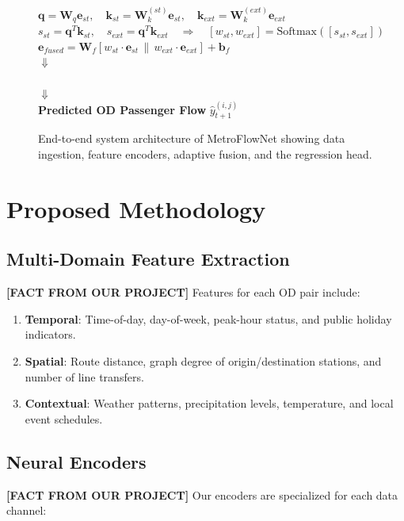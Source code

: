 \documentclass[conference]{IEEEtran}
\begin{document}
\begin{figure}[htbp]
{{{{$\mathbf{q} = \mathbf{W}_q \mathbf{e}_{st}, \quad \mathbf{k}_{st} = \mathbf{W}_k^{(st)} \mathbf{e}_{st}, \quad \mathbf{k}_{ext} = \mathbf{W}_k^{(ext)} \mathbf{e}_{ext}$ \\
$s_{st} = \mathbf{q}^T \mathbf{k}_{st}, \quad s_{ext} = \mathbf{q}^T \mathbf{k}_{ext} \quad \Longrightarrow \quad [w_{st}, w_{ext}] = \text{Softmax}([s_{st}, s_{ext}])$ \\
$\mathbf{e}_{fused} = \mathbf{W}_f [w_{st} \cdot \mathbf{e}_{st} \,\|\, w_{ext} \cdot \mathbf{e}_{ext}] + \mathbf{b}_f$}} \\
$\Downarrow$ \\
 \\
$\Downarrow$ \\
\textbf{Predicted OD Passenger Flow} $\hat{y}_{t+1}^{(i,j)}$
}}
\caption{End-to-end system architecture of MetroFlowNet showing data ingestion, feature encoders, adaptive fusion, and the regression head.}
\label{fig:architecture}
\end{figure}

\section{Proposed Methodology}
\label{sec:methodology}

\subsection{Multi-Domain Feature Extraction}
\noindent \textbf{[FACT FROM OUR PROJECT]} Features for each OD pair include:
\begin{enumerate}
    \item \textbf{Temporal}: Time-of-day, day-of-week, peak-hour status, and public holiday indicators.
    \item \textbf{Spatial}: Route distance, graph degree of origin/destination stations, and number of line transfers.
    \item \textbf{Contextual}: Weather patterns, precipitation levels, temperature, and local event schedules.
\end{enumerate}

\subsection{Neural Encoders}
\noindent \textbf{[FACT FROM OUR PROJECT]} Our encoders are specialized for each data channel:
\end{document}
